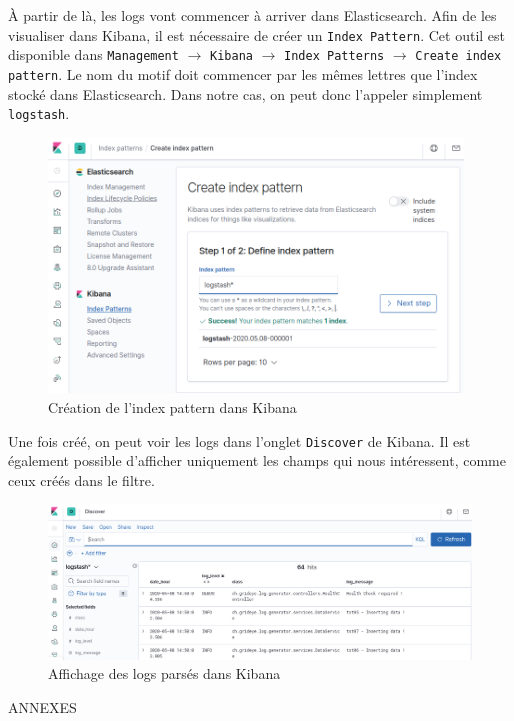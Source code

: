 \documentclass[paper=a4, fontsize=11pt]{scrartcl}
\begin{document}
À partir de là, les logs vont commencer à arriver dans Elasticsearch. Afin de les visualiser dans Kibana, il est nécessaire de créer un \verb,Index Pattern,. Cet outil est disponible dans \verb,Management, $\rightarrow$ \verb,Kibana, $\rightarrow$ \verb,Index Patterns, $\rightarrow$ \verb,Create index pattern,. Le nom du motif doit commencer par les mêmes lettres que l'index stocké dans Elasticsearch. Dans notre cas, on peut donc l'appeler simplement \verb,logstash,.
\begin{figure}[H]
    \centering
    \includegraphics[width=11cm]{img/screenshots/kib_create_index_pattern.png}
    \caption{Création de l'index pattern dans Kibana}
    \label{f-kibCreateIndexPattern}
\end{figure}
Une fois créé, on peut voir les logs dans l'onglet \verb,Discover, de Kibana. Il est également possible d'afficher uniquement les champs qui nous intéressent, comme ceux créés dans le filtre.
\begin{figure}[H]
    \centering
    \includegraphics[width=18cm]{img/screenshots/kib_logs_arrived.png}
    \caption{Affichage des logs parsés dans Kibana}
    \label{f-kibLogsArrived}
\end{figure}


\newpage

\thispagestyle{empty}
\centering
\vspace{10cm}
{\huge ANNEXES}
\end{document}

